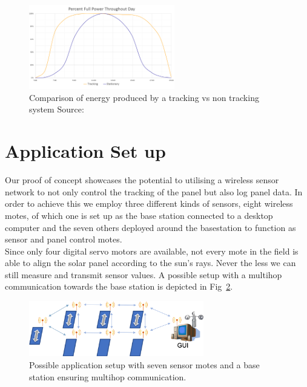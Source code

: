 \documentclass[conference]{IEEEtran}
\begin{document}
\begin{figure}[htbp]
    \includegraphics[width=2.5in]{img/ComparisonTrackingVsNoTracking.png}
    \centering
    \captionsetup{justification=centering}
    \caption{Comparison of energy produced by a tracking vs non tracking system Source: \cite{b3}}
    \label{fig:ComparisonTvsNT}
\end{figure}

% 


\section{Application Set up}

Our proof of concept showcases the potential to utilising a wireless sensor network to not only control the tracking of the panel but also log panel data. In order to achieve this we employ three different kinds of sensors, eight wireless motes, of which one is set up as the base station connected to a desktop computer and the seven others deployed around the basestation to function as sensor and panel control motes.\\
Since only four digital servo motors are available, not every mote in the field is able to align the solar panel according to the sun's rays. Never the less we can still measure and transmit sensor values. A possible setup with a multihop communication towards the base station is depicted in Fig~\ref{fig:ApplicationSetup}.

\begin{figure}[htbp]
    \includegraphics[width=3in]{img/Application_Setup.png}
    \centering
    \captionsetup{justification=centering}
    \caption{Possible application setup with seven sensor motes and a base station ensuring multihop communication.}
    \label{fig:ApplicationSetup}
\end{figure}
\end{document}
